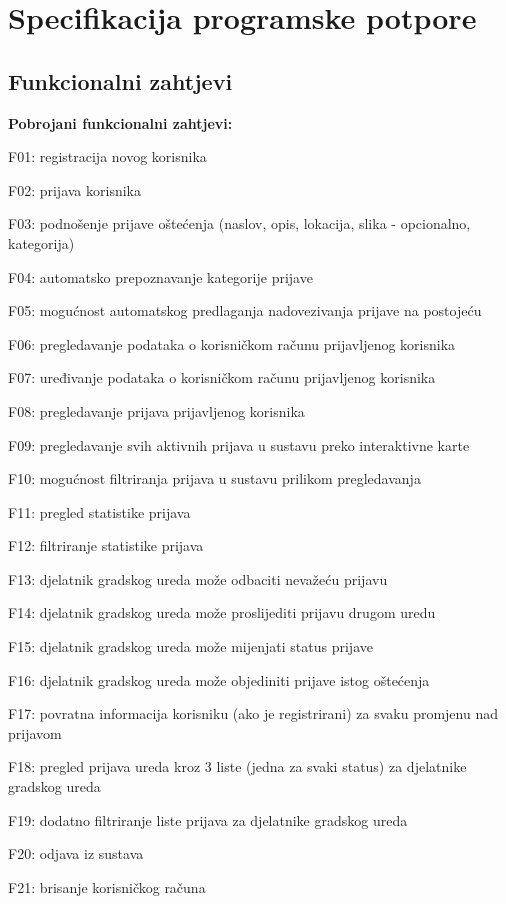 \chapter{Specifikacija programske potpore}
		
	\section{Funkcionalni zahtjevi}
			
			\textbf{Pobrojani funkcionalni zahtjevi:}
			\begin{packed_item}
				\item F01: registracija novog korisnika
				\item F02: prijava korisnika
				\item F03: podnošenje prijave oštećenja (naslov, opis, lokacija, slika - opcionalno, kategorija)
				\item F04: automatsko prepoznavanje kategorije prijave
				\item F05: mogućnost automatskog predlaganja nadovezivanja prijave na postojeću
				\item F06: pregledavanje podataka o korisničkom računu prijavljenog korisnika
				\item F07: uređivanje podataka o korisničkom računu prijavljenog korisnika
				\item F08: pregledavanje prijava prijavljenog korisnika
				\item F09: pregledavanje svih aktivnih prijava u sustavu preko interaktivne karte
				\item F10: mogućnost filtriranja prijava u sustavu prilikom pregledavanja
				\item F11: pregled statistike prijava
				\item F12: filtriranje statistike prijava
				\item F13: djelatnik gradskog ureda može odbaciti nevažeću prijavu
				\item F14: djelatnik gradskog ureda može proslijediti prijavu drugom uredu
				\item F15: djelatnik gradskog ureda može mijenjati status prijave
				\item F16: djelatnik gradskog ureda može objediniti prijave istog oštećenja
				\item F17: povratna informacija korisniku (ako je registrirani) za svaku promjenu nad prijavom
				\item F18: pregled prijava ureda kroz 3 liste (jedna za svaki status) za djelatnike gradskog ureda
				\item F19: dodatno filtriranje liste prijava za djelatnike gradskog ureda
				\item F20: odjava iz sustava
				\item F21: brisanje korisničkog računa
			\end{packed_item}
			\eject
			
